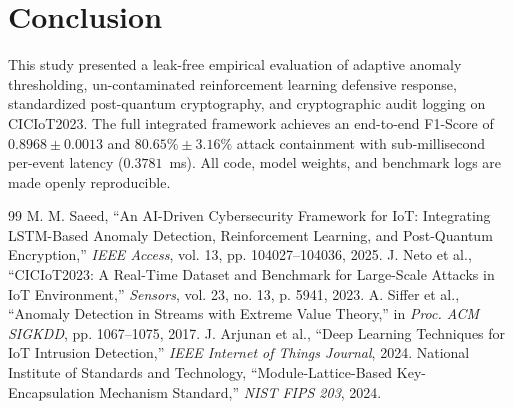 \documentclass[journal]{IEEEtran}
\begin{document}
\section{Conclusion}
This study presented a leak-free empirical evaluation of adaptive anomaly thresholding, un-contaminated reinforcement learning defensive response, standardized post-quantum cryptography, and cryptographic audit logging on CICIoT2023. The full integrated framework achieves an end-to-end F1-Score of $0.8968 \pm 0.0013$ and $80.65\% \pm 3.16\%$ attack containment with sub-millisecond per-event latency ($0.3781$~ms). All code, model weights, and benchmark logs are made openly reproducible.

\begin{thebibliography}{99}
 M. M. Saeed, ``An AI-Driven Cybersecurity Framework for IoT: Integrating LSTM-Based Anomaly Detection, Reinforcement Learning, and Post-Quantum Encryption,'' \emph{IEEE Access}, vol. 13, pp. 104027--104036, 2025.
 J. Neto et al., ``CICIoT2023: A Real-Time Dataset and Benchmark for Large-Scale Attacks in IoT Environment,'' \emph{Sensors}, vol. 23, no. 13, p. 5941, 2023.
 A. Siffer et al., ``Anomaly Detection in Streams with Extreme Value Theory,'' in \emph{Proc. ACM SIGKDD}, pp. 1067--1075, 2017.
 J. Arjunan et al., ``Deep Learning Techniques for IoT Intrusion Detection,'' \emph{IEEE Internet of Things Journal}, 2024.
 National Institute of Standards and Technology, ``Module-Lattice-Based Key-Encapsulation Mechanism Standard,'' \emph{NIST FIPS 203}, 2024.
\end{thebibliography}
\end{document}
